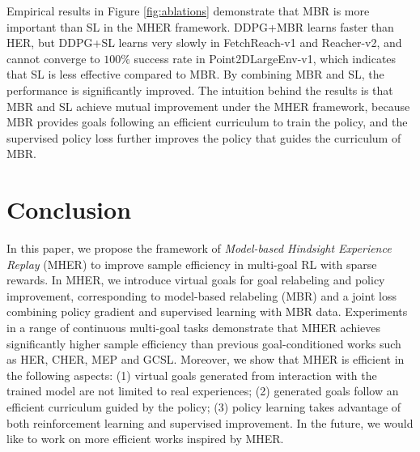 \documentclass{article}
\begin{document}
Empirical results in Figure \ref{fig:ablations} demonstrate that MBR is more important than SL in the MHER framework. DDPG+MBR learns faster than HER, but DDPG+SL learns very slowly in FetchReach-v1 and Reacher-v2, and cannot converge to $100\%$ success rate in Point2DLargeEnv-v1, which indicates that SL is less effective compared to MBR. By combining MBR and SL, the performance is significantly improved. The intuition behind the results is that MBR and SL achieve mutual improvement under the MHER framework, because MBR provides goals following an efficient curriculum to train the policy, and the supervised policy loss further improves the policy that guides the curriculum of MBR.

\section{Conclusion}
In this paper, we propose the framework of \emph{Model-based Hindsight Experience Replay} (MHER) to improve sample efficiency in multi-goal RL with sparse rewards. In MHER, we introduce virtual goals for goal relabeling and policy improvement, corresponding to model-based relabeling (MBR) and a joint loss combining policy gradient and supervised learning with MBR data. Experiments in a range of continuous multi-goal tasks demonstrate that MHER achieves significantly higher sample efficiency than previous goal-conditioned works such as HER, CHER, MEP and GCSL. Moreover, we show that MHER is efficient in the following aspects: (1) virtual goals generated from interaction with the trained model are not limited to real experiences; (2) generated goals follow an efficient curriculum guided by the policy; (3) policy learning takes advantage of both reinforcement learning and supervised improvement. In the future, we would like to work on more efficient works inspired by MHER.



\end{document}
